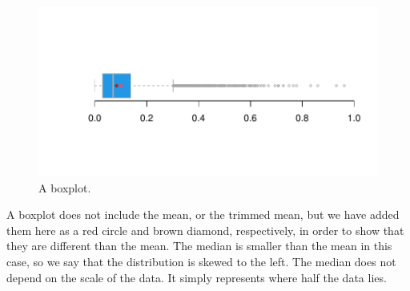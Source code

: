 \begin{knitrout}
\color{fgcolor}\begin{kframe}
\begin{alltt}
 \hlstd{=}\hlstd{,} \hlstd{=}\hlstd{,} \hlstd{=} \hlstd{,}    \hlstd{=}\hlstd{)}
\hlstd{(}\hlstd{,}  \hlstd{=} \hlstd{)}
\hlstd{(}\hlstd{,}\hlstd{=}\hlstd{,} \hlstd{=}\hlstd{,} \hlstd{=}\hlstd{)}
\hlstd{(} \hlstd{=}\hlstd{),}\hlstd{,} \hlstd{=}\hlstd{,} \hlstd{=}\hlstd{)}
\end{alltt}
\end{kframe}\begin{figure}

{\centering \includegraphics[width=\maxwidth]{figure/intro-boxplot-rexp-1} 

}

\caption[A boxplot]{A boxplot.}\label{fig:intro-boxplot-rexp}
\end{figure}

\end{knitrout}


A boxplot does not include the mean, or the trimmed mean, but we have added them here as a red circle and brown diamond, respectively, in order to show that they are different than the mean. The median is smaller than the mean in this case, so we say that the distribution is skewed to the left. The median does not depend on the scale of the data. It simply represents where half the data lies. 

